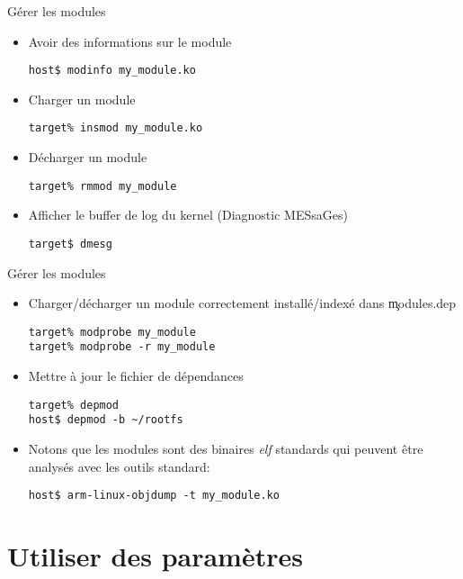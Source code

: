 \begin{frame}[fragile=singleslide]{Gérer les modules}
  \begin{itemize} 
  \item Avoir des informations sur le module
    \begin{lstlisting}
host$ modinfo my_module.ko
    \end{lstlisting} %
  \item Charger un module
    \begin{lstlisting}
target% insmod my_module.ko
    \end{lstlisting} %
  \item Décharger un module
    \begin{lstlisting}
target% rmmod my_module
    \end{lstlisting}%
  \item Afficher le buffer de log du kernel (Diagnostic MESsaGes)
    \begin{lstlisting}
target$ dmesg
    \end{lstlisting} %
  \end{itemize}
\end{frame}

\begin{frame}[fragile=singleslide]{Gérer les modules}
  \begin{itemize} 
  \item Charger/décharger un  module correctement installé/indexé dans
    \c{modules.dep}
    \begin{lstlisting}
target% modprobe my_module
target% modprobe -r my_module
    \end{lstlisting} %
  \item Mettre à jour le fichier de dépendances
    \begin{lstlisting} 
target% depmod
host$ depmod -b ~/rootfs 
    \end{lstlisting} %
  \item Notons que les  modules sont des binaires \emph{elf} standards
    qui peuvent être analysés avec les outils standard:
    \begin{lstlisting}
host$ arm-linux-objdump -t my_module.ko
    \end{lstlisting} 
  \end{itemize}
\end{frame}

\section{Utiliser des paramètres}

